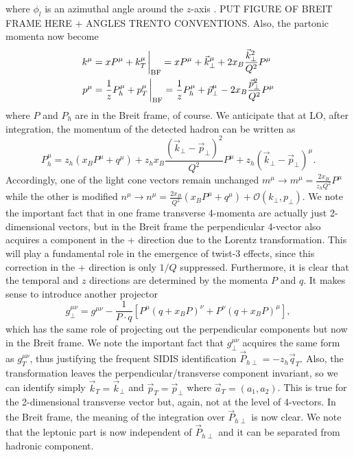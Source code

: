 where $\phi_l$ is an azimuthal angle around the $z$-axis \cite{kanazawa_contribution_2013}. PUT FIGURE OF BREIT FRAME HERE + ANGLES TRENTO CONVENTIONS.
Also, the partonic momenta now become
\begin{equation}\label{eq:partonic momenta in BF}
    \begin{aligned}
        k^\mu&=xP^\mu+k_T^\mu\eval_{\text{BF}}=x P^\mu+\vec k_\perp^\mu+2x_B\frac{\vec k_\perp^2}{Q^2}P^\mu\\
        p^\mu&=\frac{1}{z}P_h^\mu+p_T^\mu\eval_{\text{BF}}=\frac{1}{z}P_h^\mu+\vec p_\perp^\mu-2x_B\frac{\vec p_\perp^2}{Q^2}P^\mu
    \end{aligned}
\end{equation}
where $P$ and $P_h$ are in the Breit frame, of course. We anticipate that at LO, after integration, the momentum of the detected hadron can be written as
\begin{equation}
    P_h^\mu= z_h(x_BP^\mu+q^\mu)+z_hx_B\frac{(\vec k_\perp - \vec p_\perp)^2}{Q^2}P^\mu+z_h(\vec k_\perp-\vec p_\perp)^\mu.
\end{equation}
Accordingly, one of the light cone vectors remain unchanged $m ^\mu\to m^\mu=\frac{2x_B}{z_hQ^2}P^\mu$ while the other is modified $n^\mu\to n^\mu=\frac{2x_B}{Q^2}(x_BP^\mu+q^\mu)+\mathcal{O}(k_\perp,p_\perp)$. We note the important fact that in one frame transverse 4-momenta are actually just 2-dimensional vectors, but in the Breit frame the perpendicular 4-vector also acquires a component in the + direction due to the Lorentz transformation. This will play a fundamental role in the emergence of twist-3 effects, since this correction in the + direction is only $1/Q$ suppressed. Furthermore, it is clear that the temporal and $z$ directions are determined by the momenta $P$ and $q$. It makes sense to introduce another projector 
\begin{equation}
    g_\perp^{\mu\nu}=g^{\mu\nu}-\frac{1}{P\cdot q}[P^\mu(q+x_BP)^\nu + P^\nu(q+x_BP)^\mu],
\end{equation}
which has the same role of projecting out the perpendicular components but now in the Breit frame. We note the important fact that $g_\perp^{\mu\nu}$ acquires the same form as $g_T^{\mu\nu}$, thus justifying the frequent SIDIS identification $\vec P_{h\perp}=-z_h\vec q_T$. Also, the transformation leaves the perpendicular/transverse component invariant, so we can identify simply $\vec k_T=\vec k_\perp$ and $\vec p_T =\vec p_\perp$ where $\vec a_T=(a_1,a_2)$. This is true for the 2-dimensional transverse vector but, again, not at the level of 4-vectors. In the Breit frame, the meaning of the integration over $\vec P_{h\perp}$ is now clear. We note that the leptonic part is now independent of $\vec P_{h\perp}$ and it can be separated from hadronic component.

